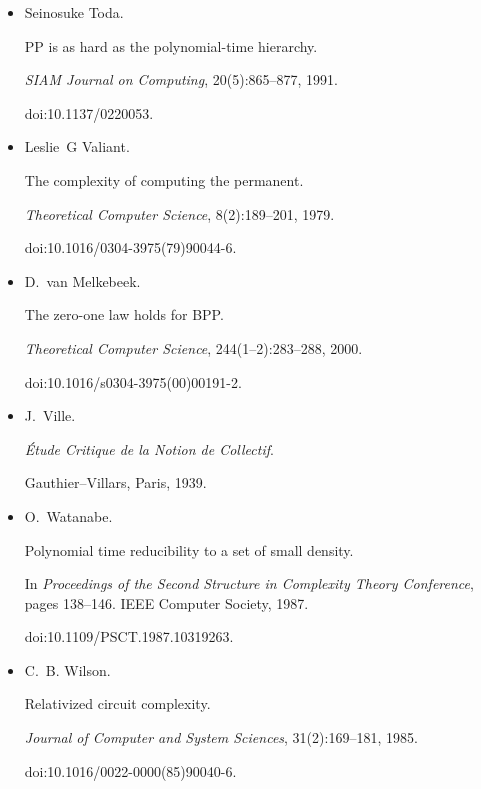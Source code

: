\begin{itemize}
doi:10.1017/9781108781718.010.





\item[] 
[75]

Seinosuke Toda.


PP is as hard as the polynomial-time hierarchy.


\emph{SIAM Journal on Computing}, 20(5):865–877, 1991.


doi:10.1137/0220053.





\item[] 
[76]

Leslie G Valiant.


The complexity of computing the permanent.


\emph{Theoretical Computer Science}, 8(2):189–201, 1979.


doi:10.1016/0304-3975(79)90044-6.





\item[] 
[77]

D. van Melkebeek.


The zero-one law holds for BPP.


\emph{Theoretical Computer Science}, 244(1–2):283–288, 2000.


doi:10.1016/s0304-3975(00)00191-2.





\item[] 
[78]

J. Ville.


\emph{Étude Critique de la Notion de Collectif}.


Gauthier–Villars, Paris, 1939.





\item[] 
[79]

O. Watanabe.


Polynomial time reducibility to a set of small density.


In \emph{Proceedings of the Second Structure in Complexity Theory
Conference}, pages 138–146. IEEE Computer Society, 1987.


doi:10.1109/PSCT.1987.10319263.





\item[] 
[80]

C. B. Wilson.


Relativized circuit complexity.


\emph{Journal of Computer and System Sciences}, 31(2):169–181, 1985.


doi:10.1016/0022-0000(85)90040-6.





\end{itemize}


